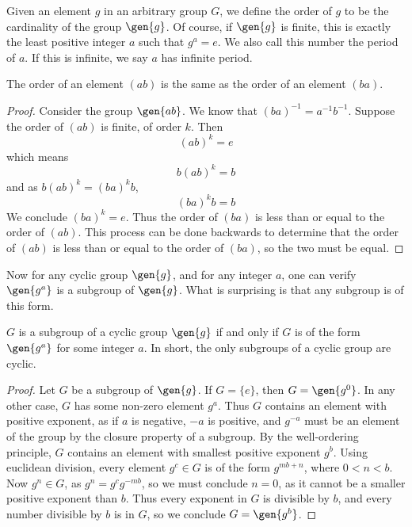 Given an element $g$ in an arbitrary group $G$, we define the order of $g$ to be the cardinality of the group $\gen{g}$. Of course, if $\gen{g}$ is finite, this is exactly the least positive integer $a$ such that $g^a = e$. We also call this number the period of $a$. If this is infinite, we say $a$ has infinite period.

\begin{lemma} The order of an element $(ab)$ is the same as the order of an element $(ba)$. \end{lemma}
\begin{proof}
    Consider the group $\gen{ab}$. We know that $(ba)^{-1} = a^{-1}b^{-1}$. Suppose the order of $(ab)$ is finite, of order $k$. Then
    \[ (ab)^k = e \]
    which means
    \[ b(ab)^k = b \]
    and as $b(ab)^k = (ba)^k b$,
    \[ (ba)^k b = b \]
    We conclude $(ba)^k = e$. Thus the order of $(ba)$ is less than or equal to the order of $(ab)$. This process can be done backwards to determine that the order of $(ab)$ is less than or equal to the order of $(ba)$, so the two must be equal.
\end{proof}

Now for any cyclic group $\gen{g}$, and for any integer $a$, one can verify $\gen{g^a}$ is a subgroup of $\gen{g}$. What is surprising is that any subgroup is of this form.

\begin{theorem}
    $G$ is a subgroup of a cyclic group $\gen{g}$ if and only if $G$ is of the form $\gen{g^a}$ for some integer $a$. In short, the only subgroups of a cyclic group are cyclic.
\end{theorem}
\begin{proof}
    Let $G$ be a subgroup of $\gen{g}$. If $G = \{ e \}$, then $G = \gen{g^0}$. In any other case, $G$ has some non-zero element $g^a$. Thus $G$ contains an element with positive exponent, as if $a$ is negative, $-a$ is positive, and $g^{-a}$ must be an element of the group by the closure property of a subgroup. By the well-ordering principle, $G$ contains an element with smallest positive exponent $g^b$. Using euclidean division, every element $g^c \in G$ is of the form $g^{mb + n}$, where $0 < n < b$. Now $g^n \in G$, as $g^n = g^cg^{-mb}$, so we must conclude $n = 0$, as it cannot be a smaller positive exponent than $b$. Thus every exponent in $G$ is divisible by $b$, and every number divisible by $b$ is in $G$, so we conclude $G = \gen{g^b}$.
\end{proof}

